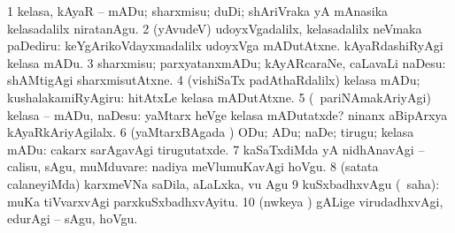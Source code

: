\begin{center}
\noindent
\gl{\akirx}
\expl{}
\bmng
\bnum
\num{1} kelasa, kAyaR -- mADu; sharxmisu; duDi; shAriVraka yA mAnasika kelasadalilx niratanAgu. 
\num{2} (yAvudeV) udoyxVgadalilx, kelasadalilx neVmaka paDediru:  keYgArikoVdayxmadalilx udoyxVga mADutAtxne.  kAyaRdashiRyAgi kelasa mADu. 
\num{3} sharxmisu; parxyatanxmADu; kAyARcaraNe, caLavaLi naDesu:  shAMtigAgi sharxmisutAtxne. 
\num{4} (vishiSaTx padAthaRdalilx) kelasa mADu; kushalakamiRyAgiru:  hitAtxLe kelasa mADutAtxne. 
\num{5} (\kanmu\ pariNAmakAriyAgi) kelasa -- mADu, naDesu:  yaMtarx heVge kelasa mADutatxde?  ninanx aBipArxya kAyaRkAriyAgilalx. 
\num{6} (yaMtarxBAgada \vi) ODu; ADu; naDe; tirugu; kelasa mADu:  cakarx sarAgavAgi tirugutatxde. 
\num{7} kaSaTxdiMda yA nidhAnavAgi -- calisu, sAgu, muMduvare:  nadiya meVlumuKavAgi hoVgu. 
\num{8} (satata calaneyiMda) karxmeVNa saDila, aLaLxka, \mo vu Agu 
\num{9} kuSxbadhxvAgu (\rUpa\ saha):  muKa tiVvarxvAgi parxkuSxbadhxvAyitu. 
\num{10} (nwkeya \vi) gALige virudadhxvAgi, edurAgi -- sAgu, hoVgu. 
\enum
\emng


\end{center}
